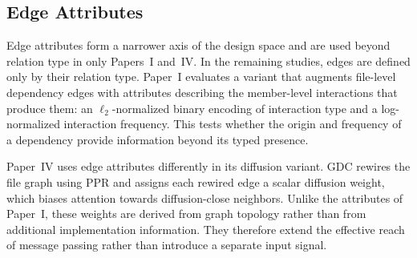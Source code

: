 \subsection{Edge Attributes}\label{sec:edge_attributes}
Edge attributes form a narrower axis of the design space and are used beyond relation type in only Papers~I and~IV. In the remaining studies, edges are defined only by their relation type. Paper~I evaluates a variant that augments file-level dependency edges with attributes describing the member-level interactions that produce them: an $\ell_2$-normalized binary encoding of interaction type and a log-normalized interaction frequency. This tests whether the origin and frequency of a dependency provide information beyond its typed presence.
 
Paper~IV uses edge attributes differently in its diffusion variant. GDC rewires the file graph using PPR and assigns each rewired edge a scalar diffusion weight, which biases attention towards diffusion-close neighbors. Unlike the attributes of Paper~I, these weights are derived from graph topology rather than from additional implementation information. They therefore extend the effective reach of message passing rather than introduce a separate input signal.

